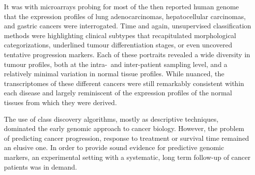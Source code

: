 It was with microarrays probing for most of the then reported human genome that
the expression profiles of lung adenocarcinomas\cite{garber_diversity_2001},
hepatocellular carcinomas,\cite{chen_gene_2002} and gastric
cancers\cite{leung_phospholipase_2002} were interrogated.  Time and again,
unsupervised classification methods were highlighting clinical subtypes that
recapitulated morphological categorizations, underlined tumour differentiation
stages, or even uncovered tentative progression markers.  Each of these
portraits revealed a wide diversity in tumour profiles, both at the \mbox{intra-
  and} \mbox{inter-patient} sampling level, and a relatively minimal variation
in normal tissue profiles.  While nuanced, the transcriptomes of these different
cancers were still remarkably consistent within each disease and largely
reminiscent of the expression profiles of the normal tissues from which they
were derived.\cite{botstein_genomic_2003}

The use of class discovery algorithms, mostly as descriptive techniques,
dominated the early genomic approach to cancer
biology.\cite{matros_genomic_2004,eschrich_dna_2004} However, the problem of
predicting cancer progression, response to treatment or survival time remained
an elusive one.  In order to provide sound evidence for predictive genomic
markers, an experimental setting with a systematic, long term follow-up of
cancer patients was in demand.

\medskip




